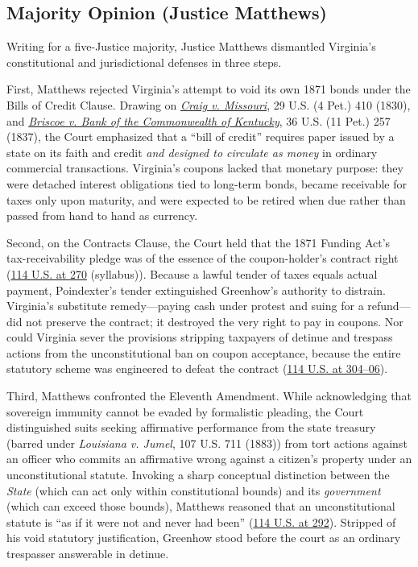 \documentclass[12pt]{article}
\begin{document}
\subsection{Majority Opinion (Justice Matthews)}

Writing for a five-Justice majority, Justice Matthews dismantled Virginia's constitutional and jurisdictional defenses in three steps.

First, Matthews rejected Virginia's attempt to void its own 1871 bonds under the Bills of Credit Clause. Drawing on \href{https://supreme.justia.com/cases/federal/us/29/410/}{\textit{Craig v. Missouri}}, 29 U.S. (4 Pet.) 410 (1830), and \href{https://supreme.justia.com/cases/federal/us/36/257/}{\textit{Briscoe v. Bank of the Commonwealth of Kentucky}}, 36 U.S. (11 Pet.) 257 (1837), the Court emphasized that a ``bill of credit'' requires paper issued by a state on its faith and credit \emph{and designed to circulate as money} in ordinary commercial transactions. Virginia's coupons lacked that monetary purpose: they were detached interest obligations tied to long-term bonds, became receivable for taxes only upon maturity, and were expected to be retired when due rather than passed from hand to hand as currency.

Second, on the Contracts Clause, the Court held that the 1871 Funding Act's tax-receivability pledge was of the essence of the coupon-holder's contract right (\href{https://supreme.justia.com/cases/federal/us/114/270/}{114 U.S. at 270} (syllabus)). Because a lawful tender of taxes equals actual payment, Poindexter's tender extinguished Greenhow's authority to distrain. Virginia's substitute remedy---paying cash under protest and suing for a refund---did not preserve the contract; it destroyed the very right to pay in coupons. Nor could Virginia sever the provisions stripping taxpayers of detinue and trespass actions from the unconstitutional ban on coupon acceptance, because the entire statutory scheme was engineered to defeat the contract (\href{https://supreme.justia.com/cases/federal/us/114/270/}{114 U.S. at 304--06}).

Third, Matthews confronted the Eleventh Amendment. While acknowledging that sovereign immunity cannot be evaded by formalistic pleading, the Court distinguished suits seeking affirmative performance from the state treasury (barred under \textit{Louisiana v. Jumel}, 107 U.S. 711 (1883)) from tort actions against an officer who commits an affirmative wrong against a citizen's property under an unconstitutional statute. Invoking a sharp conceptual distinction between the \emph{State} (which can act only within constitutional bounds) and its \emph{government} (which can exceed those bounds), Matthews reasoned that an unconstitutional statute is ``as if it were not and never had been'' (\href{https://caselaw.findlaw.com/court/us-supreme-court/114/270.html}{114 U.S. at 292}). Stripped of his void statutory justification, Greenhow stood before the court as an ordinary trespasser answerable in detinue.
\end{document}
